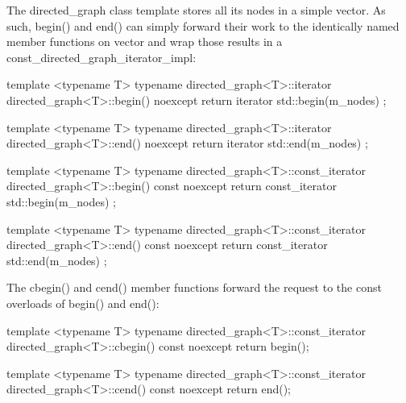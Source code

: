 The directed\_graph class template stores all its nodes in a simple vector. As such, begin() and end() can simply forward their work to the identically named member functions on vector and wrap those results in a const\_directed\_graph\_iterator\_impl:

\begin{cpp}
template <typename T>
typename directed_graph<T>::iterator
    directed_graph<T>::begin() noexcept { return iterator{ std::begin(m_nodes) }; }

template <typename T>
typename directed_graph<T>::iterator
    directed_graph<T>::end() noexcept { return iterator { std::end(m_nodes) }; }

template <typename T>
typename directed_graph<T>::const_iterator
    directed_graph<T>::begin() const noexcept
{ return const_iterator { std::begin(m_nodes) }; }

template <typename T>
typename directed_graph<T>::const_iterator
    directed_graph<T>::end() const noexcept
{ return const_iterator { std::end(m_nodes) }; }
\end{cpp}

The cbegin() and cend() member functions forward the request to the const overloads of begin() and end():

\begin{cpp}
template <typename T>
typename directed_graph<T>::const_iterator
    directed_graph<T>::cbegin() const noexcept { return begin(); }

template <typename T>
typename directed_graph<T>::const_iterator
    directed_graph<T>::cend() const noexcept { return end(); }
\end{cpp}





